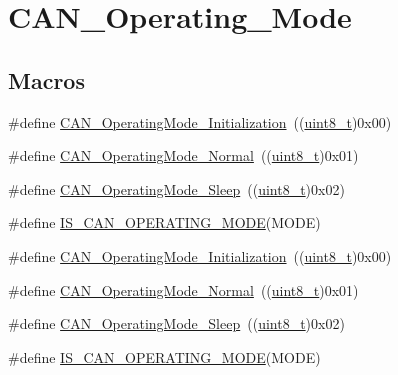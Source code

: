 \hypertarget{group___c_a_n___operating___mode}{}\section{C\+A\+N\+\_\+\+Operating\+\_\+\+Mode}
\label{group___c_a_n___operating___mode}
\subsection*{Macros}
\begin{DoxyCompactItemize}
\item 
\#define \hyperlink{group___c_a_n___operating___mode_gace8a4b5c164aba6f473d6254ad1e8a36}{C\+A\+N\+\_\+\+Operating\+Mode\+\_\+\+Initialization}~((\hyperlink{_p_e___types_8h_aba7bc1797add20fe3efdf37ced1182c5}{uint8\+\_\+t})0x00)
\item 
\#define \hyperlink{group___c_a_n___operating___mode_ga663ecffaa60d1a201a035dfa45325848}{C\+A\+N\+\_\+\+Operating\+Mode\+\_\+\+Normal}~((\hyperlink{_p_e___types_8h_aba7bc1797add20fe3efdf37ced1182c5}{uint8\+\_\+t})0x01)
\item 
\#define \hyperlink{group___c_a_n___operating___mode_ga173b85d2baaa6249d966b8073e3ad8ca}{C\+A\+N\+\_\+\+Operating\+Mode\+\_\+\+Sleep}~((\hyperlink{_p_e___types_8h_aba7bc1797add20fe3efdf37ced1182c5}{uint8\+\_\+t})0x02)
\item 
\#define \hyperlink{group___c_a_n___operating___mode_ga377f1598db9b0248ba83fa6e5a75db75}{I\+S\+\_\+\+C\+A\+N\+\_\+\+O\+P\+E\+R\+A\+T\+I\+N\+G\+\_\+\+M\+O\+DE}(M\+O\+DE)
\item 
\#define \hyperlink{group___c_a_n___operating___mode_gace8a4b5c164aba6f473d6254ad1e8a36}{C\+A\+N\+\_\+\+Operating\+Mode\+\_\+\+Initialization}~((\hyperlink{_p_e___types_8h_aba7bc1797add20fe3efdf37ced1182c5}{uint8\+\_\+t})0x00)
\item 
\#define \hyperlink{group___c_a_n___operating___mode_ga663ecffaa60d1a201a035dfa45325848}{C\+A\+N\+\_\+\+Operating\+Mode\+\_\+\+Normal}~((\hyperlink{_p_e___types_8h_aba7bc1797add20fe3efdf37ced1182c5}{uint8\+\_\+t})0x01)
\item 
\#define \hyperlink{group___c_a_n___operating___mode_ga173b85d2baaa6249d966b8073e3ad8ca}{C\+A\+N\+\_\+\+Operating\+Mode\+\_\+\+Sleep}~((\hyperlink{_p_e___types_8h_aba7bc1797add20fe3efdf37ced1182c5}{uint8\+\_\+t})0x02)
\item 
\#define \hyperlink{group___c_a_n___operating___mode_ga377f1598db9b0248ba83fa6e5a75db75}{I\+S\+\_\+\+C\+A\+N\+\_\+\+O\+P\+E\+R\+A\+T\+I\+N\+G\+\_\+\+M\+O\+DE}(M\+O\+DE)
\end{DoxyCompactItemize}


